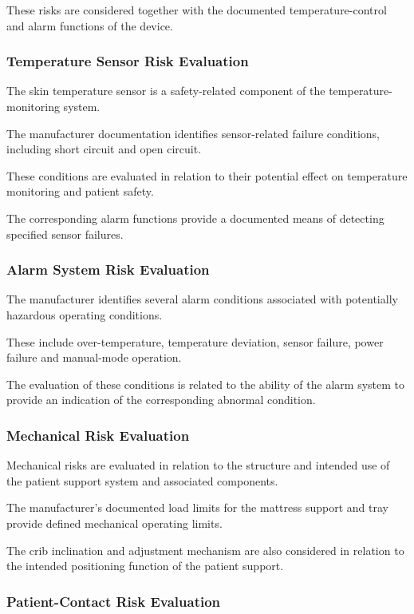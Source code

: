 These risks are considered together with the documented temperature-control
and alarm functions of the device.

\subsubsection{Temperature Sensor Risk Evaluation}

The skin temperature sensor is a safety-related component of the
temperature-monitoring system.

The manufacturer documentation identifies sensor-related failure conditions,
including short circuit and open circuit.

These conditions are evaluated in relation to their potential effect on
temperature monitoring and patient safety.

The corresponding alarm functions provide a documented means of detecting
specified sensor failures.

\subsubsection{Alarm System Risk Evaluation}

The manufacturer identifies several alarm conditions associated with
potentially hazardous operating conditions.

These include over-temperature, temperature deviation, sensor failure,
power failure and manual-mode operation.

The evaluation of these conditions is related to the ability of the alarm
system to provide an indication of the corresponding abnormal condition.

\subsubsection{Mechanical Risk Evaluation}

Mechanical risks are evaluated in relation to the structure and intended use
of the patient support system and associated components.

The manufacturer's documented load limits for the mattress support and tray
provide defined mechanical operating limits.

The crib inclination and adjustment mechanism are also considered in
relation to the intended positioning function of the patient support.

\subsubsection{Patient-Contact Risk Evaluation}

